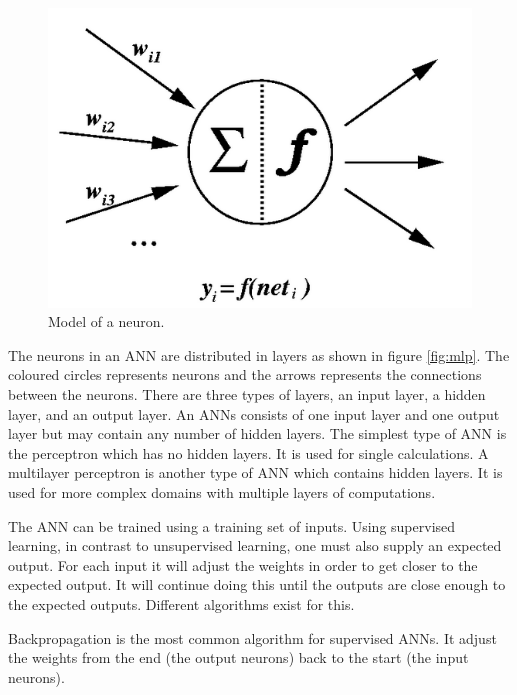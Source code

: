 \begin{figure}[H]
  \center
    \includegraphics[scale=0.4]{images/nn/neuron.png}
  \caption{Model of a neuron. \label{fig:neuron}}
\end{figure}

The neurons in an ANN are distributed in layers as shown in figure \ref{fig:mlp}. The coloured circles represents neurons and the arrows represents the connections between the neurons. There are three types of layers, an input layer, a hidden layer, and an output layer. An ANNs consists of one input layer and one output layer but may contain any number of hidden layers. The simplest type of ANN is the perceptron which has no hidden layers. It is used for single calculations. A multilayer perceptron is another type of ANN which contains hidden layers. It is used for more complex domains with multiple layers of computations. 


\vspace{4mm}


The ANN can be trained using a training set of inputs. Using supervised learning, in contrast to unsupervised learning, one must also supply an expected output. For each input it will adjust the weights in order to get closer to the expected output. It will continue doing this until the outputs are close enough to the expected outputs. Different algorithms exist for this. 

Backpropagation is the most common algorithm for supervised ANNs. It adjust the weights from the end (the output neurons) back to the start (the input neurons).

